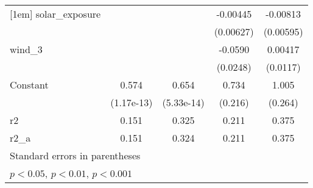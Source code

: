 {\begin{tabular}{l*{4}{c}}
[1em]
solar\_exposure      &                     &                     &    -0.00445         &    -0.00813         \\
                    &                     &                     &   (0.00627)         &   (0.00595)         \\
[1em]
wind\_3              &                     &                     &     -0.0590         &     0.00417         \\
                    &                     &                     &    (0.0248)         &    (0.0117)         \\
[1em]
Constant            &       0.574\sym{***}&       0.654\sym{***}&       0.734\sym{*}  &       1.005\sym{*}  \\
                    &  (1.17e-13)         &  (5.33e-14)         &     (0.216)         &     (0.264)         \\
\hline
r2                  &       0.151         &       0.325         &       0.211         &       0.375         \\
r2\_a                &       0.151         &       0.324         &       0.211         &       0.375         \\
\hline\hline
\multicolumn{5}{l}{\footnotesize Standard errors in parentheses}\\
\multicolumn{5}{l}{\footnotesize \sym{*} \(p<0.05\), \sym{**} \(p<0.01\), \sym{***} \(p<0.001\)}\\
\end{tabular}
}
